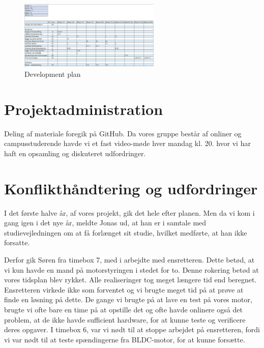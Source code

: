 \begin{figure}[h]
  \centering
  \includegraphics[width=0.6\textwidth]{./figurer/p1.png}
  \caption{Development plan}
  \label{fig:p1}
\end{figure}


\section{Projektadministration}
\label{sec:proj-}

Deling af materiale foregik på GitHub.%
Da vores gruppe består af onliner og campusstuderende havde vi et fast video-møde hver mandag kl. 20. hvor vi har haft en opsamling og diskuteret udfordringer.

\section{Konflikthåndtering og udfordringer}
\label{sec:konfl-}

I det første halve år, af vores projekt, gik det hele efter planen. Men da vi kom i gang igen i det nye år, meldte Jonas ud, at han er i samtale med studievejledningen om at få forlænget sit studie, hvilket medførte, at han ikke forsatte. 

Derfor gik Søren fra timebox 7, med i arbejdte med ensretteren. Dette betød, at vi kun havde en mand på motorstyringen i stedet for to. Denne rokering betød at vores tidsplan blev rykket. Alle realiseringer tog meget længere tid end beregnet. Ensretteren virkede ikke som forventet og vi brugte meget tid på at prøve at finde en løsning på dette. De  gange vi brugte på at lave en test på vores motor, brugte vi ofte bare en time på at opstille det og ofte havde onlinere også det problem, at de ikke havde sufficient hardware, for at kunne teste og verificere deres opgaver.
I timebox 6, var vi nødt til at stoppe arbejdet på ensretteren, fordi vi var nødt til at teste spændingerne fra BLDC-motor, for at kunne forsætte.

